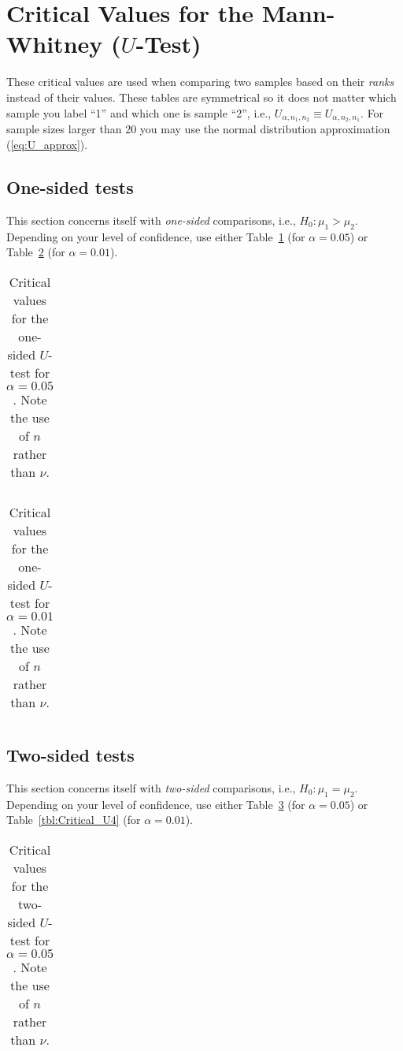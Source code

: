 \clearpage
\section{Critical Values for the Mann-Whitney ($U$-Test)}
These critical values are used when comparing two samples based on their
\emph{ranks} instead of their values.  These tables are symmetrical so it does not matter
which sample you label ``1'' and which one is sample ``2'', i.e., $U_{\alpha,n_1,n_2} \equiv U_{\alpha,n_2,n_1}$.
For sample sizes larger than 20 you may use the normal distribution approximation (\ref{eq:U_approx}).
\subsection{One-sided tests}
This section concerns itself with \emph{one-sided} comparisons,
i.e., $H_0: \mu_1 > \mu_2$.  Depending on your level of confidence, use either
Table~\ref{tbl:Critical_U1} (for $\alpha = 0.05$) or 
Table~\ref{tbl:Critical_U2} (for $\alpha = 0.01$).
\begin{table}[h]
\centering
\footnotesize
\begin{tabular}{|c|ccccccccccccccccccc|} \hline

\end{tabular}
\normalsize
\caption{Critical values for the one-sided $U$-test for $\alpha = 0.05$.  Note the use of $n$ rather than $\nu$.}
\label{tbl:Critical_U1}
\end{table}

\begin{table}[h]
\centering
\footnotesize
\begin{tabular}{|c|ccccccccccccccccccc|} \hline

\end{tabular}
\normalsize
\caption{Critical values for the one-sided $U$-test for $\alpha = 0.01$.  Note the use of $n$ rather than $\nu$.}
\label{tbl:Critical_U2}
\end{table}

\clearpage
\subsection{Two-sided tests}
This section concerns itself with \emph{two-sided} comparisons,
i.e., $H_0: \mu_1 = \mu_2$.  Depending on your level of confidence, use either
Table~\ref{tbl:Critical_U3} (for $\alpha = 0.05$) or 
Table~\ref{tbl:Critical_U4} (for $\alpha = 0.01$).
\begin{table}[h]
\centering
\footnotesize
\begin{tabular}{|c|ccccccccccccccccccc|} \hline

\end{tabular}
\normalsize
\caption{Critical values for the two-sided $U$-test for $\alpha = 0.05$.  Note the use of $n$ rather than $\nu$.}
\label{tbl:Critical_U3}
\end{table}


